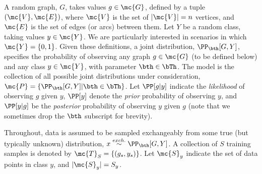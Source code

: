 A random graph, $G$, takes values $g \in \mc{G}$, defined by a tuple $(\mc{V},\mc{E})$, where $\mc{V}$ is the set of $|\mc{V}|=n$ vertices, and $\mc{E}$ is the set of edges (or arcs) between them. 
% 
% 
% 
Let $Y$ be a random class, taking values $y \in \mc{Y}$.  We are particularly interested in scenarios in which $\mc{Y}=\{0,1\}$.  Given these definitions, a joint distribution, $\PP_{\bth} [G,Y]$, specifies the probability of observing any graph $g \in \mc{G}$ (to be defined below) and any class $y \in \mc{Y}$, with parameter $\bth \in \bTh$.  The model is the collection of all possible joint distributions under consideration, $\mc{P}=\{\PP_{\bth}[G,Y] | \bth \in \bTh \}$. Let $\PP[g|y]$ indicate the \emph{likelihood} of observing $g$ given $y$, $\PP[y]$ denote the \emph{prior} probability of observing $y$, and $\PP[y|g]$ be the \emph{posterior} probability of observing $y$ given $g$ (note that we sometimes drop the $\bth$ subscript for brevity).  
 









Throughout, data is assumed to be sampled exchangeably from some true (but typically unknown) distribution, $x \overset{exch.}{\sim} \PP_{\bth}[G,Y]$.  A collection of $S$ training samples is denoted by $\mc{T}_S=\{(g_s,y_s)\}$.  Let $\mc{S}_y$ indicate the set of data points in class $y$, and $|\mc{S}_y|=S_y$.
% 
% 


